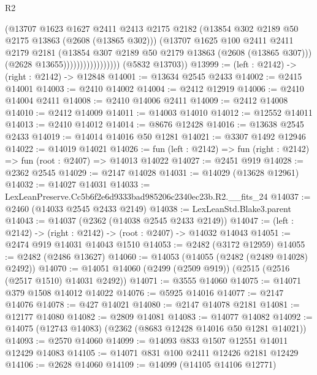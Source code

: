 \begin{lexlean}{R2}
\begin{coremodule}
                                  (@13707
                                    @1623
                                    @1627
                                    @2411
                                    @2413
                                    @2175
                                    @2182
                                    (@13854 @302 @2189 @50 @2175 @13863 (@2608 (@13865 @302)))
                                    (@13707
                                      @1625
                                      @100
                                      @2411
                                      @2411
                                      @2179
                                      @2181
                                      (@13854 @307 @2189 @50 @2179 @13863 (@2608 (@13865 @307)))
                                      (@2628 @13655)))))))))))))))))
      (@5832 @13703))
@13999 := (left : @2142) -> (right : @2142) -> @12848
@14001 := @13634 @2545 @2433
@14002 := @2415 @14001
@14003 := @2410 @14002
@14004 := @2412 @12919
@14006 := @2410 @14004 @2411
@14008 := @2410 @14006 @2411
@14009 := @2412 @14008
@14010 := @2412 @14009
@14011 := @14003 @14010
@14012 := @12552 @14011
@14013 := @2410 @14012
@14014 := @8676 @12428
@14016 := @13638 @2545 @2433
@14019 := @14014 @14016 @50 @1281
@14021 := @3307 @1492 @12946
@14022 := @14019 @14021
@14026 := fun (left : @2142) => fun (right : @2142) => fun (root : @2407) => @14013 @14022
@14027 := @2451 @919
@14028 := @2362 @2545
@14029 := @2147 @14028
@14031 := @14029 (@13628 @12961)
@14032 := @14027 @14031
@14033 := LexLeanPreserve.Cc5b6f2e6d9333bad985206c2340ec23b.R2.__fits_24
@14037 := @2460 (@14033 @2545 @2433 @2149)
@14038 := LexLeanStd.Blake3.parent
@14043 := @14037 (@2362 (@14038 @2545 @2433 @2149))
@14047 := (left : @2142) -> (right : @2142) -> (root : @2407) -> @14032 @14043
@14051 := @2474 @919 @14031 @14043 @1510
@14053 := @2482 (@3172 @12959)
@14055 := @2482 (@2486 @13627)
@14060 := @14053 (@14055 (@2482 (@2489 @14028) @2492))
@14070 := @14051 @14060 (@2499 (@2509 @919)) (@2515 (@2516 (@2517 @1510) @14031 @2492))
@14071 := @3555 @14060
@14075 := @14071 @379 @1508 @14012 @14022
@14076 := @5925 @14016
@14077 := @2147 @14076
@14078 := @427 @14021
@14080 := @2147 @14078 @2181
@14081 := @12177 @14080
@14082 := @2809 @14081
@14083 := @14077 @14082
@14092 := @14075 (@12743 @14083) (@2362 (@8683 @12428 @14016 @50 @1281 @14021))
@14093 := @2570 @14060
@14099 := @14093 @833 @1507 @12551 @14011 @12429 @14083
@14105 := @14071 @831 @100 @2411 @12426 @2181 @12429
@14106 := @2628 @14060
@14109 := @14099 (@14105 @14106 @12771)

\end{coremodule}
\end{lexlean}
